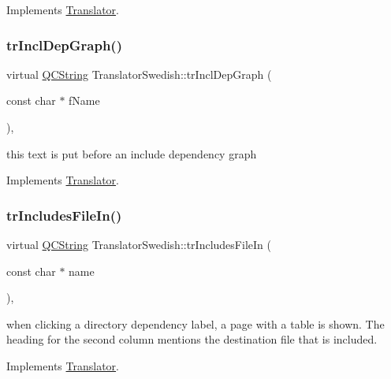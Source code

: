 Implements \mbox{\hyperlink{class_translator}{Translator}}.

\mbox{\label{class_translator_swedish_aea0ec3552432050c953367c79d5dcbb4}} 
\subsubsection{\texorpdfstring{trInclDepGraph()}{trInclDepGraph()}}
{\footnotesize\ttfamily virtual \mbox{\hyperlink{class_q_c_string}{Q\+C\+String}} Translator\+Swedish\+::tr\+Incl\+Dep\+Graph (\begin{DoxyParamCaption}\item[{const char $\ast$}]{f\+Name }\end{DoxyParamCaption})\hspace{0.3cm}{\ttfamily [inline]}, {\ttfamily [virtual]}}

this text is put before an include dependency graph 

Implements \mbox{\hyperlink{class_translator}{Translator}}.

\mbox{\label{class_translator_swedish_a5e9e47078cb0c729b7b21172898f39b1}} 
\subsubsection{\texorpdfstring{trIncludesFileIn()}{trIncludesFileIn()}}
{\footnotesize\ttfamily virtual \mbox{\hyperlink{class_q_c_string}{Q\+C\+String}} Translator\+Swedish\+::tr\+Includes\+File\+In (\begin{DoxyParamCaption}\item[{const char $\ast$}]{name }\end{DoxyParamCaption})\hspace{0.3cm}{\ttfamily [inline]}, {\ttfamily [virtual]}}

when clicking a directory dependency label, a page with a table is shown. The heading for the second column mentions the destination file that is included. 

Implements \mbox{\hyperlink{class_translator}{Translator}}.

